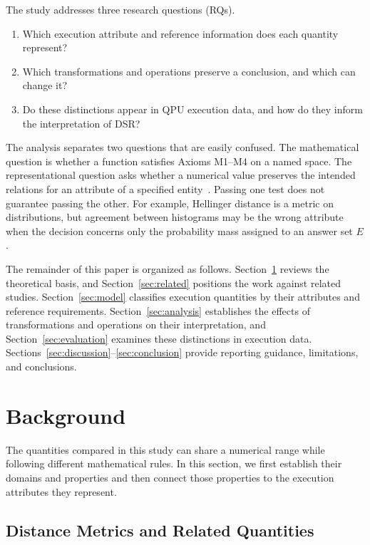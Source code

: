 \documentclass[10pt,conference]{IEEEtran}
\begin{document}
The study addresses three research questions (RQs).
\begin{enumerate}[label=\textbf{RQ\arabic*},ref=\arabic*,leftmargin=*,itemsep=2pt,parsep=0pt,topsep=3pt]
\item\label{rq:attributes} Which execution attribute and reference information does each quantity represent?
\item\label{rq:operations} Which transformations and operations preserve a conclusion, and which can change it?
\item\label{rq:evidence} Do these distinctions appear in QPU execution data, and how do they inform the interpretation of DSR?
\end{enumerate}

The analysis separates two questions that are easily confused. The mathematical question is whether a function satisfies Axioms M1--M4 on a named space. The representational question asks whether a numerical value preserves the intended relations for an attribute of a specified entity~\cite{fentonBieman2015,fenton1994}. Passing one test does not guarantee passing the other. For example, Hellinger distance is a metric on distributions, but agreement between histograms may be the wrong attribute when the decision concerns only the probability mass assigned to an answer set $E$.

The remainder of this paper is organized as follows. Section~\ref{sec:background} reviews the theoretical basis, and Section~\ref{sec:related} positions the work against related studies. Section~\ref{sec:model} classifies execution quantities by their attributes and reference requirements. Section~\ref{sec:analysis} establishes the effects of transformations and operations on their interpretation, and Section~\ref{sec:evaluation} examines these distinctions in execution data. Sections~\ref{sec:discussion}--\ref{sec:conclusion} provide reporting guidance, limitations, and conclusions.

\section{Background}
\label{sec:background}

The quantities compared in this study can share a numerical range while following different mathematical rules. In this section, we first establish their domains and properties and then connect those properties to the execution attributes they represent.

\subsection{Distance Metrics and Related Quantities}
\label{sec:vocab}
\end{document}
